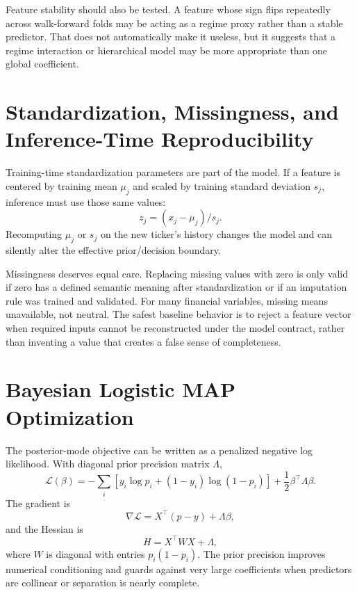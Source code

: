 \documentclass[11pt]{article}
\begin{document}
Feature stability should also be tested. A feature whose sign flips repeatedly across walk-forward folds may be acting as a regime proxy rather than a stable predictor. That does not automatically make it useless, but it suggests that a regime interaction or hierarchical model may be more appropriate than one global coefficient.

\section{Standardization, Missingness, and Inference-Time Reproducibility}
Training-time standardization parameters are part of the model. If a feature is centered by training mean $\mu_j$ and scaled by training standard deviation $s_j$, inference must use those same values:
\begin{equation}
z_j=(x_j-\mu_j)/s_j.
\end{equation}
Recomputing $\mu_j$ or $s_j$ on the new ticker's history changes the model and can silently alter the effective prior/decision boundary.

Missingness deserves equal care. Replacing missing values with zero is only valid if zero has a defined semantic meaning after standardization or if an imputation rule was trained and validated. For many financial variables, missing means unavailable, not neutral. The safest baseline behavior is to reject a feature vector when required inputs cannot be reconstructed under the model contract, rather than inventing a value that creates a false sense of completeness.

\section{Bayesian Logistic MAP Optimization}
The posterior-mode objective can be written as a penalized negative log likelihood. With diagonal prior precision matrix $\Lambda$,
\begin{equation}
\mathcal L(\beta)=-\sum_i\left[y_i\log p_i+(1-y_i)\log(1-p_i)\right]+\frac12\beta^\top\Lambda\beta.
\end{equation}
The gradient is
\begin{equation}
\nabla\mathcal L=X^\top(p-y)+\Lambda\beta,
\end{equation}
and the Hessian is
\begin{equation}
H=X^\top W X+\Lambda,
\end{equation}
where $W$ is diagonal with entries $p_i(1-p_i)$. The prior precision improves numerical conditioning and guards against very large coefficients when predictors are collinear or separation is nearly complete.
\end{document}
